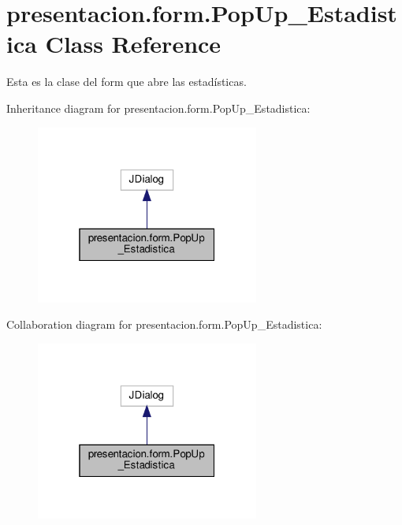 \hypertarget{classpresentacion_1_1form_1_1PopUp__Estadistica}{}\section{presentacion.\+form.\+Pop\+Up\+\_\+\+Estadistica Class Reference}
\label{classpresentacion_1_1form_1_1PopUp__Estadistica}


Esta es la clase del form que abre las estadísticas.  




Inheritance diagram for presentacion.\+form.\+Pop\+Up\+\_\+\+Estadistica\+:\nopagebreak
\begin{figure}[H]
\begin{center}
\leavevmode
\includegraphics[width=208pt]{classpresentacion_1_1form_1_1PopUp__Estadistica__inherit__graph}
\end{center}
\end{figure}


Collaboration diagram for presentacion.\+form.\+Pop\+Up\+\_\+\+Estadistica\+:\nopagebreak
\begin{figure}[H]
\begin{center}
\leavevmode
\includegraphics[width=208pt]{classpresentacion_1_1form_1_1PopUp__Estadistica__coll__graph}
\end{center}
\end{figure}
